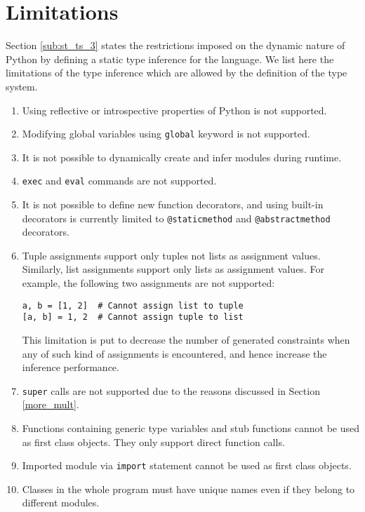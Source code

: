 \section{Limitations}
Section \ref{sub:st_ts_3} states the restrictions imposed on the dynamic nature of Python by defining a static type inference for the language. We list here the limitations of the type inference which are allowed by the definition of the type system.

\begin{enumerate}
\item Using reflective or introspective properties of Python is not supported.
\item Modifying global variables using \lstinline|global| keyword is not supported.
\item It is not possible to dynamically create and infer modules during runtime.
\item \lstinline|exec| and \lstinline|eval| commands are not supported.
\item It is not possible to define new function decorators, and using built-in decorators is currently limited to \lstinline|@staticmethod| and \lstinline|@abstractmethod| decorators.
\item Tuple assignments support only tuples not lists as assignment values. Similarly, list assignments support only lists as assignment values. For example, the following two assignments are not supported:
\begin{lstlisting}
a, b = [1, 2]  # Cannot assign list to tuple
[a, b] = 1, 2  # Cannot assign tuple to list
\end{lstlisting}
This limitation is put to decrease the number of generated constraints when any of such kind of assignments is encountered, and hence increase the inference performance.

\item \lstinline|super| calls are not supported due to the reasons discussed in Section \ref{more_mult}.

\item Functions containing generic type variables and stub functions cannot be used as first class objects. They only support direct function calls.
\item Imported module via \lstinline|import| statement cannot be used as first class objects.

\item Classes in the whole program must have unique names even if they belong to different modules.
\end{enumerate}
